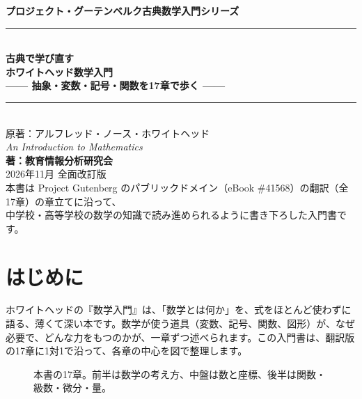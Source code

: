 \documentclass[a4paper,11pt,openany]{ltjsbook}
\begin{document}
\begin{titlepage}
\begin{center}
\vspace*{1.5cm}
{\Large\bfseries プロジェクト・グーテンベルク古典数学入門シリーズ}\\[0.8cm]
\rule{\textwidth}{1.5pt}\\[0.4cm]
{\Huge\bfseries 古典で学び直す\\ホワイトヘッド数学入門}\\[0.4cm]
{\Large\bfseries —— 抽象・変数・記号・関数を17章で歩く ——}\\[0.4cm]
\rule{\textwidth}{1.5pt}\\[1.5cm]
{\large 原著：アルフレッド・ノース・ホワイトヘッド\\
\textit{An Introduction to Mathematics}}\\[2.0cm]
{\Large\bfseries 著：教育情報分析研究会}\\[2.5cm]
\vfill
{\large 2026年11月 全面改訂版}\\[0.5cm]
{\footnotesize 本書は Project Gutenberg のパブリックドメイン（eBook \#41568）の翻訳（全17章）の章立てに沿って、\\
中学校・高等学校の数学の知識で読み進められるように書き下ろした入門書です。}
\end{center}
\end{titlepage}

\frontmatter
\tableofcontents
\mainmatter

\chapter*{はじめに}

ホワイトヘッドの『数学入門』は、「数学とは何か」を、式をほとんど使わずに語る、薄くて深い本です。数学が使う道具（変数、記号、関数、図形）が、なぜ必要で、どんな力をもつのかが、一章ずつ述べられます。この入門書は、翻訳版の17章に1対1で沿って、各章の中心を図で整理します。

\begin{figure}[htbp]
\centering
{}
\caption{本書の17章。前半は数学の考え方、中盤は数と座標、後半は関数・級数・微分・量。}
\end{figure}
\end{document}
